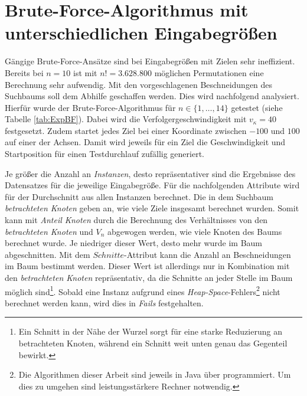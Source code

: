 \documentclass[german,version-2019-11]{uzl-thesis}
\begin{document}
\section{Brute-Force-Algorithmus mit unterschiedlichen Eingabegrößen}
\label{kap5:bf}

Gängige Brute-Force-Ansätze sind bei Eingabegrößen mit Zielen sehr ineffizient. Bereits bei $n=10$ ist mit $n!=3.628.800$ möglichen Permutationen eine Berechnung sehr aufwendig. Mit den vorgeschlagenen Beschneidungen des Suchbaums soll dem Abhilfe geschaffen werden. Dies wird nachfolgend analysiert. Hierfür wurde der Brute-Force-Algorithmus für $n\in\{1,\dots,14\}$ getestet (siehe Tabelle \ref{tab:ExpBF}). Dabei wird die Verfolgergeschwindigkeit mit $v_{\kappa}=40$ festgesetzt. Zudem startet jedes Ziel bei einer Koordinate zwischen $-100$ und $100$ auf einer der Achsen. Damit wird jeweils für ein Ziel die Geschwindigkeit und Startposition für einen Testdurchlauf zufällig generiert.

Je größer die Anzahl an \emph{Instanzen}, desto repräsentativer sind die Ergebnisse des Datensatzes für die jeweilige Eingabegröße. Für die nachfolgenden Attribute wird für der Durchschnitt aus allen Instanzen berechnet. Die in dem Suchbaum \emph{betrachteten Knoten} geben an, wie viele Ziele insgesamt berechnet wurden. Somit kann mit \emph{Anteil Knoten} durch die Berechnung des Verhältnisses von den \emph{betrachteten Knoten} und $V_n$ abgewogen werden, wie viele Knoten des Baums berechnet wurde. Je niedriger dieser Wert, desto mehr wurde im Baum abgeschnitten. Mit dem $Schnitte$-Attribut kann die Anzahl an Beschneidungen im Baum bestimmt werden. Dieser Wert ist allerdings nur in Kombination mit den \emph{betrachteten Knoten} repräsentativ, da die Schnitte an jeder Stelle im Baum möglich sind\footnote{Ein Schnitt in der Nähe der Wurzel sorgt für eine starke Reduzierung an betrachteten Knoten, während ein Schnitt weit unten genau das Gegenteil bewirkt.}. Sobald eine Instanz aufgrund eines \emph{Heap-Space}-Fehlers\footnote{Die Algorithmen dieser Arbeit sind jeweils in Java über programmiert. Um dies zu umgehen sind leistungsstärkere Rechner notwendig.} nicht berechnet werden kann, wird dies in \emph{Fails} festgehalten.
\end{document}
